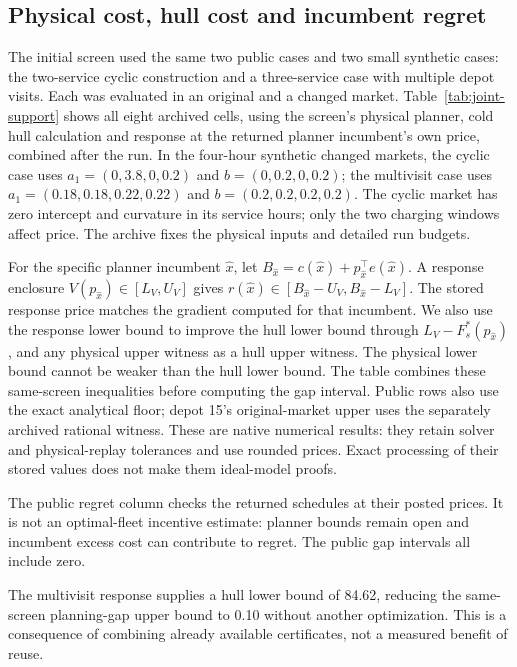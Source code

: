 \subsection{Physical cost, hull cost and incumbent regret}

The initial screen used the same two public cases and two small synthetic
cases: the two-service cyclic construction and a three-service case with
multiple depot visits. Each was evaluated in an original and a changed
market. Table~\ref{tab:joint-support} shows all eight archived cells,
using the screen's physical planner, cold hull calculation and response at
the returned planner incumbent's own price, combined after the run. In the
four-hour synthetic changed markets, the cyclic case uses $a_1=(0,3.8,0,0.2)$ and
$b=(0,0.2,0,0.2)$; the multivisit case uses $a_1=(0.18,0.18,0.22,0.22)$
and $b=(0.2,0.2,0.2,0.2)$. The cyclic market has zero intercept and
curvature in its service hours; only the two charging windows affect price.
The archive fixes the physical inputs and detailed run budgets.

For the specific planner incumbent $\hat x$, let
$B_{\hat x}=c(\hat x)+p_{\hat x}^{\top}e(\hat x)$. A response enclosure
$V(p_{\hat x})\in[L_V,U_V]$ gives
$r(\hat x)\in[B_{\hat x}-U_V,B_{\hat x}-L_V]$.
The stored response price matches the gradient computed for that incumbent.
We also use the response lower bound to improve the hull lower bound through
$L_V-F_s^*(p_{\hat x})$, and any physical upper witness as a hull upper witness.
The physical lower bound cannot be weaker than the hull lower bound. The table
combines these same-screen inequalities before computing the gap interval.
Public rows also use the exact analytical floor; depot 15's original-market
upper uses the separately archived rational witness.
These are native numerical results: they retain solver and physical-replay
tolerances and use rounded prices. Exact processing of their stored values
does not make them ideal-model proofs.



The public regret column checks the returned schedules at their posted
prices. It is not an optimal-fleet incentive estimate: planner bounds remain
open and incumbent excess cost can contribute to regret. The public gap
intervals all include zero.

The multivisit response supplies a hull lower bound of 84.62, reducing the
same-screen planning-gap upper bound to 0.10 without another optimization.
This is a consequence of combining already available certificates, not a
measured benefit of reuse.

